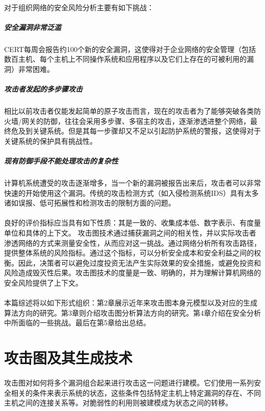 \documentclass[12pt,a4paper]{article}
\begin{document}
\paragraph{}
对于组织网络的安全风险分析主要有如下挑战：
\subparagraph{安全漏洞非常泛滥}
CERT\cite{2}每周会报告约100个新的安全漏洞，这使得对于企业网络的安全管理（包括数百主机、每个主机上不同操作系统和应用程序以及它们上存在的可被利用的漏洞）非常困难。
\subparagraph{攻击者发起的多步骤攻击}
相比以前攻击者仅能发起简单的原子攻击而言，现在的攻击者为了能够突破各类防火墙/网关的防御，往往会采用多步骤、多宿主的攻击，逐渐渗透进整个网络，最终危及到关键系统。但是其每一步骤却又不足以引起防护系统的警报，这使得对于关键系统的保护具有挑战性。
\subparagraph{现有防御手段不能处理攻击的复杂性}计算机系统遭受的攻击逐渐增多，当一个新的漏洞被报告出来后，攻击者可以非常快速的开始使用这个漏洞。传统的攻击检测方式（如入侵检测系统IDS）具有太多诸如误报、低可拓展性和检测攻击的限制方面的问题。
\paragraph{}
良好的评价指标应当具有如下性质：其是一致的、收集成本低、数字表示、有度量单位和具体的上下文\cite{2}。 攻击图技术通过捕获漏洞之间的相关性，并以实际攻击者渗透网络的方式来测量安全性，从而应对这一挑战。通过网络分析所有攻击路径，提供整体系统的风险指标。通过这个指标，可以分析安全成本和安全利益之间的权衡。因此，决策者可以避免过度投资无法产生实际效果的安全措施，或避免投资和风险造成毁灭性后果。攻击图技术的度量是一致、明确的，并为理解计算机网络的安全风险提供了上下文。
\paragraph{}
本篇综述将以如下形式组织：第2章展示近年来攻击图本身元模型以及对应的生成算法方向的研究。第3章则介绍攻击图分析算法方向的研究。第4章介绍在安全分析中所面临的一些挑战。最后在第5章给出总结。

\section{攻击图及其生成技术}

\paragraph{}
攻击图对如何将多个漏洞组合起来进行攻击这一问题进行建模。它们使用一系列安全相关的条件来表示系统的状态，这些条件包括特定主机上特定漏洞的存在、不同主机之间的连接关系等。对脆弱性的利用则被建模成为状态之间的转移。
\end{document}
